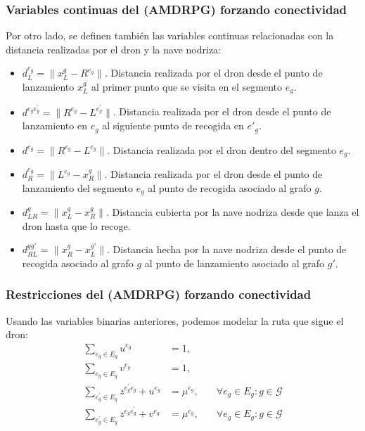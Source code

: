 \documentclass[slidestop,usepdftitle=false, xcolor=table]{beamer}
\begin{document}
\begin{frame}
	\frametitle{Variables continuas del (AMDRPG) forzando conectividad}
	
\begin{footnotesize}
	Por otro lado, se definen también las variables continuas relacionadas con la distancia realizadas por el dron y la nave nodriza:
\begin{itemize}
    \item $d_L^{e_g} = \|x_L^g - R^{e_g}\|$. Distancia realizada por el dron desde el punto de lanzamiento $x_L^g$ al primer punto que se visita en el segmento $e_g$.
    \item $d^{e_ge^\prime_g} = \|R^{e_g} - L^{e^\prime_g}\|$. Distancia realizada por el dron desde el punto de lanzamiento en $e_g$ al siguiente punto de recogida en $e'_g$.
    \item $d^{e_g} = \|R^{e_g} - L^{e_g}\|$. Distancia realizada por el dron dentro del segmento $e_g$.
    \item $d_R^{e_g} = \|L^{e_g} - x_R^g\|$. Distancia realizada por el dron desde el punto de lanzamiento del segmento $e_g$ al punto de recogida asociado al grafo $g$.
    \item $d_{LR}^g = \|x_L^g - x_R^g\|$. Distancia cubierta por la nave nodriza desde que lanza el dron hasta que lo recoge.
    \item $d_{RL}^{gg'} = \|x_R^g - x_L^{g'}\|$. Distancia hecha por la nave nodriza desde el punto de recogida asociado al grafo $g$ al punto de lanzamiento asociado al grafo $g'$.
\end{itemize}
\end{footnotesize}

\end{frame}

	\begin{frame}
		\frametitle{Restricciones del (AMDRPG) forzando conectividad}
		Usando las variables binarias anteriores, podemos modelar la ruta que sigue el dron:
\begin{align}
    \sum_{e_g\in E_g} u^{e_g} & = 1, \label{DEnt2}\\%
    \sum_{e_g\in E_g} v^{e_g} & = 1, \label{DExt}\\%
    \sum_{e^\prime_g\in E_g} z^{e^\prime_ge_g} + u^{e_g} & = \mu^{e_g}, &\quad\forall e_g\in E_g:g\in\mathcal G \label{DInu}\\
    \sum_{e^\prime_g\in E_g} z^{e_ge^\prime_g} + v^{e_g} & = \mu^{e_g}, &\quad\forall e_g\in E_g:g\in\mathcal G \label{DInv2}
    \end{align}

	\end{frame}
\end{document}
